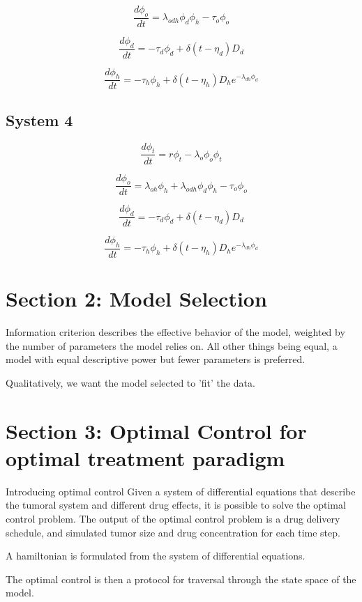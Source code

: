 \documentclass{article}
\begin{document}
$$ \frac{d \phi_o}{dt} = \lambda_{odh} \phi_d \phi_h - \tau_o \phi_o $$

$$ \frac{d \phi_d}{dt} = - \tau_d \phi_d + \delta (t - \eta_d) D_d $$

$$ \frac{d \phi_h}{dt} = - \tau_h \phi_h + \delta (t - \eta_h) D_h e^{-\lambda_{dh} \phi_d} $$



\subsection{System 4}

$$ \frac{d \phi_t}{dt} = r \phi_t - \lambda_o \phi_o \phi_t $$


$$ \frac{d \phi_o}{dt} = \lambda_{oh} \phi_h + \lambda_{odh} \phi_d \phi_h - \tau_o \phi_o $$

$$ \frac{d \phi_d}{dt} = - \tau_d \phi_d + \delta (t - \eta_d) D_d $$

$$ \frac{d \phi_h}{dt} = - \tau_h \phi_h + \delta (t - \eta_h) D_h e^{-\lambda_{dh} \phi_d} $$





\section{Section 2: Model Selection}


Information criterion describes the effective behavior of the model, weighted by the number of parameters the model relies on. All other things being equal, a model with equal descriptive power but fewer parameters is preferred. 

Qualitatively, we want the model selected to 'fit' the data. 




\section{Section 3: Optimal Control for optimal treatment paradigm}

Introducing optimal control
Given a system of differential equations that describe the tumoral system and different drug effects, it is possible to solve the optimal control problem. The output of the optimal control problem is a drug delivery schedule, and simulated tumor size and drug concentration for each time step. 


A hamiltonian is formulated from the system of differential equations. 

The optimal control is then a protocol for traversal through the state space of the model. 
\end{document}
